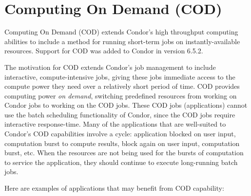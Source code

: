 \section{\label{sec:cod}Computing On Demand (COD)}

Computing On Demand (COD) extends Condor's high throughput
computing abilities to include
a method for running short-term jobs on instantly-available resources.
Support for COD was added to Condor in version 6.5.2.   



The motivation for COD extends Condor's job management to
include interactive, compute-intensive jobs,
giving these jobs immediate access to the
compute power they need over a relatively short period of time.
COD provides
computing power \emph{on demand}, 
switching predefined resources from working on Condor jobs
to working on the COD jobs. 
These COD jobs (applications) cannot use the batch
scheduling functionality of Condor, since the COD jobs require
interactive response-time.
Many of the applications that are well-suited to Condor's
COD capabilities involve a cycle:
application blocked on user input, computation burst to compute
results, block again on user input, computation burst, etc.
When the resources are not being used for the bursts of computation to
service the application, they should continue to execute
long-running batch jobs.

Here are examples of applications that may benefit from COD capability:

